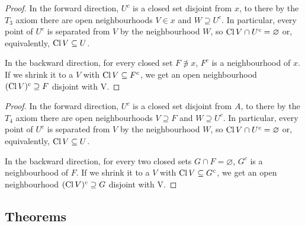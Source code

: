 
\begin{proof}
    In the forward direction, \( U^c \) is a closed set disjoint from \( x \), to there by the \( T_3 \) axiom there are open neighbourhoods \( V \in x \) and \( W \supseteq U^c \). In particular, every point of \( U^c \) is separated from \( V \) by the neighbourhood \( W \), so \( \operatorname{Cl} V \cap U^c = \varnothing \) or, equivalently, \( \operatorname{Cl} V \subseteq U \).

    In the backward direction, for every closed set \( F \not\ni x \), \( F^c \) is a neighbourhood of \( x \). If we shrink it to a \( V \) with \( \operatorname{Cl} V \subseteq F^c \), we get an open neighbourhood \( (\operatorname{Cl} V)^c \supseteq F \) disjoint with V.
\end{proof}


\begin{proof}
In the forward direction, \( U^c \) is a closed set disjoint from \( A \), to there by the \( T_4 \) axiom there are open neighbourhoods \( V \supseteq F \) and \( W \supseteq U^c \). In particular, every point of \( U^c \) is separated from \( V \) by the neighbourhood \( W \), so \( \operatorname{Cl} V \cap U^c = \varnothing \) or, equivalently, \( \operatorname{Cl} V \subseteq U \).

In the backward direction, for every two closed sets \( G \cap F = \varnothing \), \( G^c \) is a neighbourhood of \( F \). If we shrink it to a \( V \) with \( \operatorname{Cl} V \subseteq G^c \), we get an open neighbourhood \( (\operatorname{Cl} V)^c \supseteq G \) disjoint with V.
\end{proof}
\subsection{Theorems}

